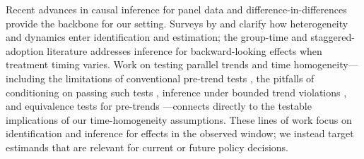 \documentclass{article}
\begin{document}
Recent advances in causal inference for panel data and difference-in-differences provide the backbone for our setting. Surveys by \citet{arkhangelskyCausalModelsLongitudinal2024} and \citet{dechaisemartinTwowayFixedEffects2023} clarify how heterogeneity and dynamics enter identification and estimation; the group-time and staggered-adoption literature \citep{callawayDifferenceindifferencesMultipleTime2021,sunEstimatingDynamicTreatment2021,rothEfficientEstimationStaggered2023,bakerDifferenceinDifferencesDesignsPractitioners2025} addresses inference for backward-looking effects when treatment timing varies. Work on testing parallel trends and time homogeneity---including the limitations of conventional pre-trend tests \citep{freyaldenhovenPreeventTrendsPanel2019}, the pitfalls of conditioning on passing such tests \citep{rothPretestCautionEventstudy2022}, inference under bounded trend violations \citep{rambachanMoreCredibleApproach2023}, and equivalence tests for pre-trends \citep{detteTestingEquivalencePreTrends2024}---connects directly to the testable implications of our time-homogeneity assumptions. These lines of work focus on identification and inference for effects in the observed window; we instead target estimands that are relevant for current or future policy decisions.
\end{document}

